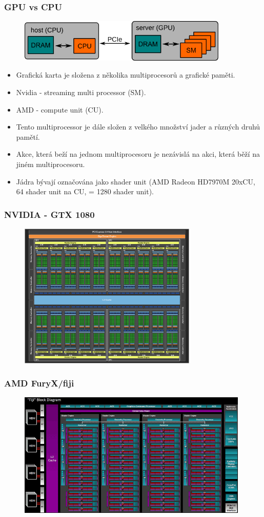 \begin{frame}
\frametitle{GPU vs CPU}
	\begin{figure}[h]
	\includegraphics[width=10cm,keepaspectratio]{pics/gpu/gpu_common}
	\end{figure}
	\begin{itemize}
	\item Grafická karta je složena z několika multiprocesorů a grafické paměti.
  \item Nvidia - streaming multi processor (SM).
  \item AMD   - compute unit (CU).
  \item Tento multiprocessor je dále složen z velkého množství jader a různých druhů pamětí.
  \item Akce, která beží na jednom multiprocesoru je nezávislá na akci, která běží na jiném multiprocesoru.
  \item Jádra bývají označována jako shader unit (AMD Radeon HD7970M 20xCU, 64 shader unit na CU, = 1280 shader unit).
	\end{itemize}
\end{frame}

\begin{frame}
\frametitle{NVIDIA - GTX 1080}
	\begin{figure}[h]
	\includegraphics[width=8.5cm,keepaspectratio]{pics/gpu/1080}
	\end{figure}
\end{frame}

\begin{frame}
\frametitle{AMD FuryX/fiji}
	\begin{figure}[h]
	\includegraphics[width=11cm,keepaspectratio]{pics/gpu/furyx}
	\end{figure}
\end{frame}

